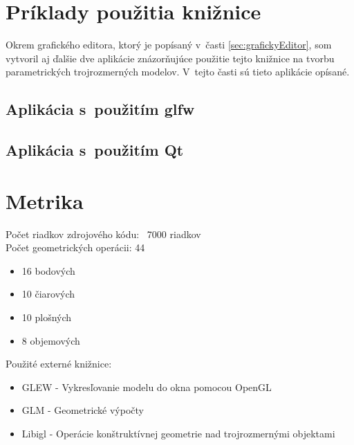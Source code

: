 \section{Príklady použitia knižnice}
Okrem grafického editora, ktorý je popísaný v~časti \ref{sec:grafickyEditor}, som vytvoril aj ďalšie dve aplikácie znázorňujúce použitie tejto knižnice na tvorbu parametrických trojrozmerných modelov.  V~tejto časti sú tieto aplikácie opísané.


\subsection*{Aplikácia s~použitím glfw}

\subsection*{Aplikácia s~použitím Qt}




\section{Metrika}
Počet riadkov zdrojového kódu: ~7000 riadkov \\
Počet geometrických operácii: 44
\begin{itemize}
    \item 16 bodových
    \item 10 čiarových
    \item 10 plošných
    \item 8 objemových
\end{itemize}
Použité externé knižnice:
\begin{itemize}
    \item GLEW - Vykresľovanie modelu do okna pomocou OpenGL
    \item GLM - Geometrické výpočty 
    \item Libigl - Operácie konštruktívnej geometrie nad trojrozmernými objektami
\end{itemize}









